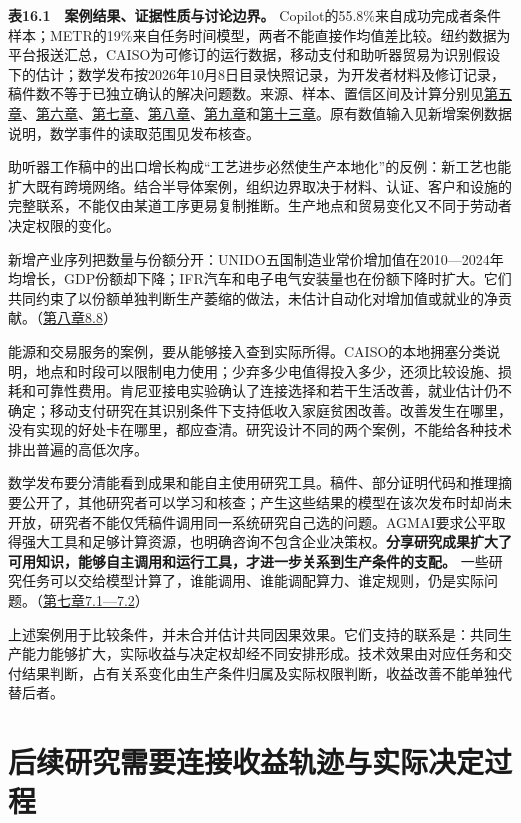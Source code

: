 \documentclass[UTF8,fontset=windows,12pt,a4paper,oneside,openany]{ctexbook}
\begin{document}
\textbf{表16.1　案例结果、证据性质与讨论边界。} Copilot的55.8\%来自成功完成者条件样本；METR的19\%来自任务时间模型，两者不能直接作均值差比较。纽约数据为平台报送汇总，CAISO为可修订的运行数据，移动支付和助听器贸易为识别假设下的估计；数学发布按2026年10月8日目录快照记录，为开发者材料及修订记录，稿件数不等于已独立确认的解决问题数。来源、样本、置信区间及计算分别见\hyperref[ch:5]{第五章}、\hyperref[ch:6]{第六章}、\hyperref[ch:7]{第七章}、\hyperref[ch:8]{第八章}、\hyperref[ch:9]{第九章}和\hyperref[ch:13]{第十三章}。原有数值输入见新增案例数据说明，数学事件的读取范围见发布核查。



助听器工作稿中的出口增长构成“工艺进步必然使生产本地化”的反例：新工艺也能扩大既有跨境网络。结合半导体案例，组织边界取决于材料、认证、客户和设施的完整联系，不能仅由某道工序更易复制推断。生产地点和贸易变化又不同于劳动者决定权限的变化。

新增产业序列把数量与份额分开：UNIDO五国制造业常价增加值在2010—2024年均增长，GDP份额却下降；IFR汽车和电子电气安装量也在份额下降时扩大。它们共同约束了以份额单独判断生产萎缩的做法，未估计自动化对增加值或就业的净贡献。（\hyperref[ch:8]{第八章8.8}）

能源和交易服务的案例，要从能够接入查到实际所得。CAISO的本地拥塞分类说明，地点和时段可以限制电力使用；少弃多少电值得投入多少，还须比较设施、损耗和可靠性费用。肯尼亚接电实验确认了连接选择和若干生活改善，就业估计仍不确定；移动支付研究在其识别条件下支持低收入家庭贫困改善。改善发生在哪里，没有实现的好处卡在哪里，都应查清。研究设计不同的两个案例，不能给各种技术排出普遍的高低次序。

数学发布要分清能看到成果和能自主使用研究工具。稿件、部分证明代码和推理摘要公开了，其他研究者可以学习和核查；产生这些结果的模型在该次发布时却尚未开放，研究者不能仅凭稿件调用同一系统研究自己选的问题。AGMAI要求公平取得强大工具和足够计算资源，也明确咨询不包含企业决策权。\textbf{分享研究成果扩大了可用知识，能够自主调用和运行工具，才进一步关系到生产条件的支配。} 一些研究任务可以交给模型计算了，谁能调用、谁能调配算力、谁定规则，仍是实际问题。（\hyperref[ch:7]{第七章7.1—7.2}）

上述案例用于比较条件，并未合并估计共同因果效果。它们支持的联系是：共同生产能力能够扩大，实际收益与决定权却经不同安排形成。技术效果由对应任务和交付结果判断，占有关系变化由生产条件归属及实际权限判断，收益改善不能单独代替后者。

\section{后续研究需要连接收益轨迹与实际决定过程}
\end{document}
